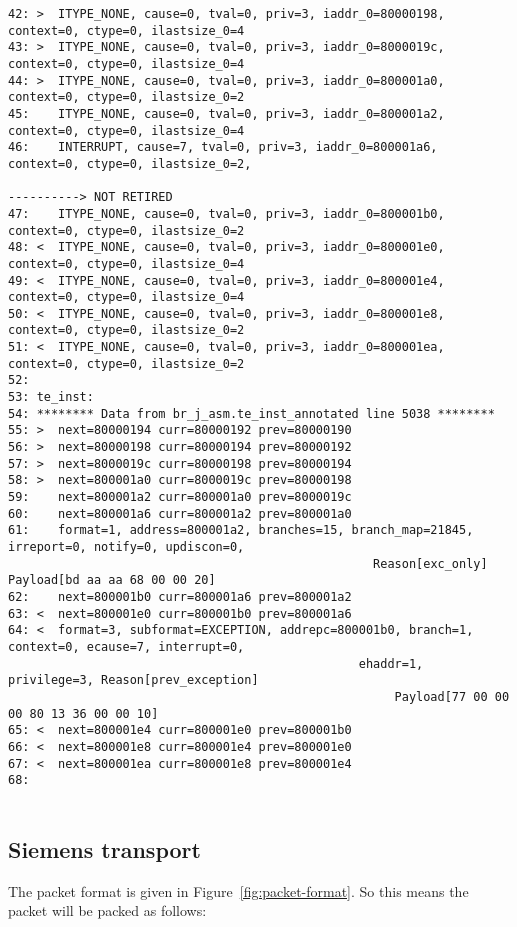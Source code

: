 \begin{lstlisting}[basicstyle=\tiny]
42: >  ITYPE_NONE, cause=0, tval=0, priv=3, iaddr_0=80000198, context=0, ctype=0, ilastsize_0=4
43: >  ITYPE_NONE, cause=0, tval=0, priv=3, iaddr_0=8000019c, context=0, ctype=0, ilastsize_0=4
44: >  ITYPE_NONE, cause=0, tval=0, priv=3, iaddr_0=800001a0, context=0, ctype=0, ilastsize_0=2
45:    ITYPE_NONE, cause=0, tval=0, priv=3, iaddr_0=800001a2, context=0, ctype=0, ilastsize_0=4
46:    INTERRUPT, cause=7, tval=0, priv=3, iaddr_0=800001a6, context=0, ctype=0, ilastsize_0=2,
                                                                              ----------> NOT RETIRED
47:    ITYPE_NONE, cause=0, tval=0, priv=3, iaddr_0=800001b0, context=0, ctype=0, ilastsize_0=2
48: <  ITYPE_NONE, cause=0, tval=0, priv=3, iaddr_0=800001e0, context=0, ctype=0, ilastsize_0=4
49: <  ITYPE_NONE, cause=0, tval=0, priv=3, iaddr_0=800001e4, context=0, ctype=0, ilastsize_0=4
50: <  ITYPE_NONE, cause=0, tval=0, priv=3, iaddr_0=800001e8, context=0, ctype=0, ilastsize_0=2
51: <  ITYPE_NONE, cause=0, tval=0, priv=3, iaddr_0=800001ea, context=0, ctype=0, ilastsize_0=2
52:
53: te_inst:
54: ******** Data from br_j_asm.te_inst_annotated line 5038 ********
55: >  next=80000194 curr=80000192 prev=80000190
56: >  next=80000198 curr=80000194 prev=80000192
57: >  next=8000019c curr=80000198 prev=80000194
58: >  next=800001a0 curr=8000019c prev=80000198
59:    next=800001a2 curr=800001a0 prev=8000019c
60:    next=800001a6 curr=800001a2 prev=800001a0
61:    format=1, address=800001a2, branches=15, branch_map=21845, irreport=0, notify=0, updiscon=0,
                                                   Reason[exc_only] Payload[bd aa aa 68 00 00 20]
62:    next=800001b0 curr=800001a6 prev=800001a2
63: <  next=800001e0 curr=800001b0 prev=800001a6
64: <  format=3, subformat=EXCEPTION, addrepc=800001b0, branch=1, context=0, ecause=7, interrupt=0,
                                                 ehaddr=1, privilege=3, Reason[prev_exception]
                                                      Payload[77 00 00 00 80 13 36 00 00 10]
65: <  next=800001e4 curr=800001e0 prev=800001b0
66: <  next=800001e8 curr=800001e4 prev=800001e0
67: <  next=800001ea curr=800001e8 prev=800001e4
68:
  
\end{lstlisting}

\subsection{Siemens transport}

The packet format is given in Figure~\ref{fig:packet-format}. So this means the packet will be packed as follows:

